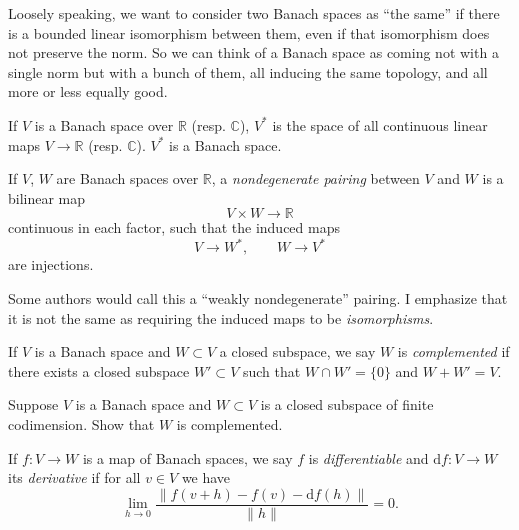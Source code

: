 \documentclass[12pt,letterpaper,reqno]{article}
\numberwithin{equation}{section}
\newcommand{\R}{\ensuremath{\mathbb R}}
\newcommand{\C}{\ensuremath{\mathbb C}}
\newcommand{\de}{\mathrm{d}}
\newcommand{\norm}[1]{\lVert#1\rVert}
\newcommand{\ti}[1]{\textit{#1}}
\begin{document}
Loosely speaking, we want to consider two Banach spaces as
``the same'' if there is a bounded linear isomorphism
between them, even if that isomorphism does not preserve the
norm. So we can think of a Banach space as coming not with
a single norm but with a bunch of them, all inducing the
same topology, and all more or less equally good.

\begin{defn} If $V$ is a Banach space
over $\R$ (resp. $\C$),
$V^*$ is the space of all continuous linear maps $V \to \R$
(resp. $\C$). $V^*$ is a Banach space.
\end{defn}

\begin{defn} If $V$, $W$
are Banach spaces over $\R$, a \ti{nondegenerate pairing}
between $V$ and $W$ is a bilinear map
\begin{equation}
  V \times W \to \R
\end{equation}
continuous in each factor,
such that the induced maps
\begin{equation}
  V \to W^*, \qquad W \to V^*
\end{equation}
are injections.
\end{defn}

Some authors would call this a ``weakly nondegenerate'' pairing.
I emphasize that it is not the same as requiring the induced maps
to be \ti{isomorphisms}.

\begin{defn} If $V$ is a Banach space
and $W \subset V$ a closed subspace, we say $W$ is
\ti{complemented} if there exists a closed subspace $W' \subset V$
such that $W \cap W' = \{0\}$ and $W + W' = V$.
\end{defn}

\begin{exercise} Suppose $V$ is a Banach space and
 $W \subset V$ is a closed subspace of finite codimension.
 Show that $W$ is complemented.
\end{exercise}

\begin{defn}
If $f: V \to W$ is a map of Banach spaces,
we say $f$ is \ti{differentiable} and $\de f: V \to W$ its
\ti{derivative} if for all $v \in V$ we have
\begin{equation}
  \lim_{h \to 0} \frac{\norm{f(v+h) - f(v) - \de f(h)}}{\norm{h}} = 0.
\end{equation}
\end{defn}
\end{document}
